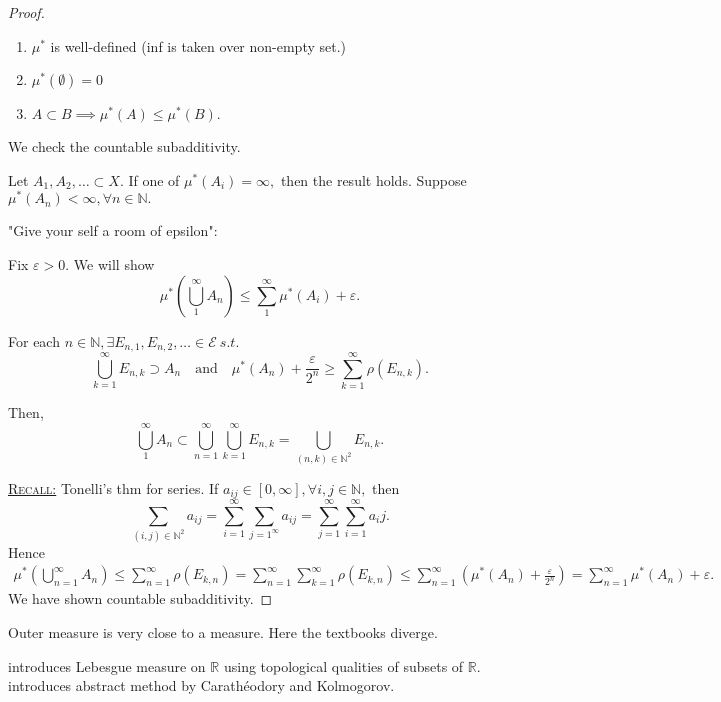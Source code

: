 \documentclass{report}
\newcommand{\R}{\mathbb{R}}
\newcommand{\N}{\mathbb{N}}
\newcommand{\st}{\ s.t.\ }
\newcommand{\fancyem}[1]{\underline{\textsc{#1}}}
\theoremstyle{definition}
\theoremstyle{remark}
\begin{document}
\begin{proof}
\begin{enumerate}
	\item
	$\mu^*$ is well-defined (inf is taken over non-empty set.)
	\item
	$\mu^*(\emptyset) = 0$
	\item
	$A \subset B \implies \mu^*(A) \leq \mu^*(B).$
\end{enumerate}
We check the countable subadditivity.

Let $A_1, A_2, \ldots \subset X.$ If one of $\mu^*(A_i) = \infty,$ then the result holds. Suppose $\mu^*(A_n) < \infty, \forall n \in \N.$

"Give your self a room of epsilon":

Fix $\varepsilon > 0.$ We will show \[\mu^*\left(\bigcup_1^\infty A_n\right) \leq \sum_1^\infty \mu^*(A_i) + \varepsilon.\]

For each $n \in \N, \exists E_{n,1}, E_{n,2}, \ldots \in \mathcal{E} \st$ \[\bigcup_{k=1}^\infty E_{n, k} \supset A_n \quad \text{and} \quad \mu^*(A_n) + \frac{\varepsilon}{2^n}\geq \sum_{k=1}^\infty \rho(E_{n, k}).\]

Then, \[
\bigcup_1^\infty A_n \subset \bigcup_{n=1}^\infty \bigcup_{k=1}^\infty E_{n, k} = \bigcup_{(n, k) \in \N^2} E_{n, k}.
\]

\fancyem{Recall:} Tonelli's thm for series.
If $a_{ij} \in [0, \infty], \forall i, j \in \N, $ then
\[
\sum_{(i, j) \in \N^2} a_{ij} = \sum_{i=1}^\infty\sum_{j=1^\infty} a_{ij} = \sum_{j=1}^\infty\sum_{i=1}^\infty a_ij.
\]
Hence 
\begin{align*}
\mu^*\left(\bigcup_{n=1}^\infty A_n\right) \leq \sum_{n=1}^\infty \rho(E_{k, n}) = \sum_{n=1}^\infty \sum_{k=1}^\infty \rho(E_{k, n}) \leq \sum_{n=1}^\infty\left(\mu^*(A_n) + \frac{\varepsilon}{2^n}\right) = \sum_{n=1}^\infty \mu^*(A_n) + \varepsilon.
\end{align*}
We have shown countable subadditivity.
\end{proof}

Outer measure is very close to a measure. Here the textbooks diverge.

\cite{taoIntroductionMeasureTheory2011} introduces Lebesgue measure on $\R$ using topological qualities of subsets of $\R.$\\
\cite{follandRealAnalysisModern1999} introduces abstract method by Carathéodory and Kolmogorov.
\end{document}
